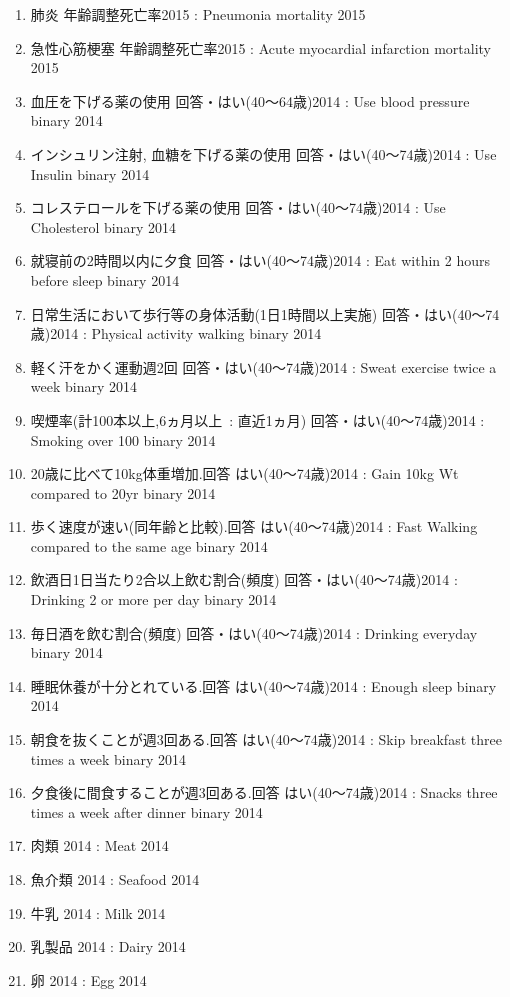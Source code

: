\begin{multicols}{2}
\begin{enumerate}
  \item 肺炎 年齢調整死亡率2015  :  Pneumonia mortality 2015
  \item 急性心筋梗塞 年齢調整死亡率2015  :  Acute myocardial infarction mortality 2015
  \item 血圧を下げる薬の使用 回答・はい(40〜64歳)2014  :  Use blood pressure binary 2014
  \item インシュリン注射, 血糖を下げる薬の使用 回答・はい(40〜74歳)2014  :  Use Insulin binary 2014
  \item コレステロールを下げる薬の使用 回答・はい(40〜74歳)2014  :  Use Cholesterol binary 2014
  \item 就寝前の2時間以内に夕食 回答・はい(40〜74歳)2014  :  Eat within 2 hours before sleep binary 2014
  \item 日常生活において歩行等の身体活動(1日1時間以上実施) 回答・はい(40〜74歳)2014  :  Physical activity walking binary 2014
  \item 軽く汗をかく運動週2回 回答・はい(40〜74歳)2014  :  Sweat exercise twice a week binary 2014
  \item 喫煙率(計100本以上,6ヵ月以上\ : 直近1ヵ月) 回答・はい(40〜74歳)2014  :  Smoking over 100 binary 2014
  \item 20歳に比べて10kg体重増加.回答 はい(40〜74歳)2014  :  Gain 10kg Wt compared to 20yr binary 2014
  \item 歩く速度が速い(同年齢と比較).回答 はい(40〜74歳)2014  :  Fast Walking compared to the same age binary 2014
  \item 飲酒日1日当たり2合以上飲む割合(頻度) 回答・はい(40〜74歳)2014  :  Drinking 2 or more per day binary 2014
  \item 毎日酒を飲む割合(頻度) 回答・はい(40〜74歳)2014  :  Drinking everyday binary 2014
  \item 睡眠休養が十分とれている.回答 はい(40〜74歳)2014  :  Enough sleep binary 2014
  \item 朝食を抜くことが週3回ある.回答 はい(40〜74歳)2014  :  Skip breakfast three times a week binary 2014
  \item 夕食後に間食することが週3回ある.回答 はい(40〜74歳)2014  :  Snacks three times a week after dinner binary 2014
  \item 肉類 2014  :  Meat 2014
  \item 魚介類 2014  :  Seafood 2014
  \item 牛乳 2014  :  Milk 2014
  \item 乳製品 2014  :  Dairy 2014
  \item 卵 2014  :  Egg 2014

\end{enumerate}
\end{multicols}
